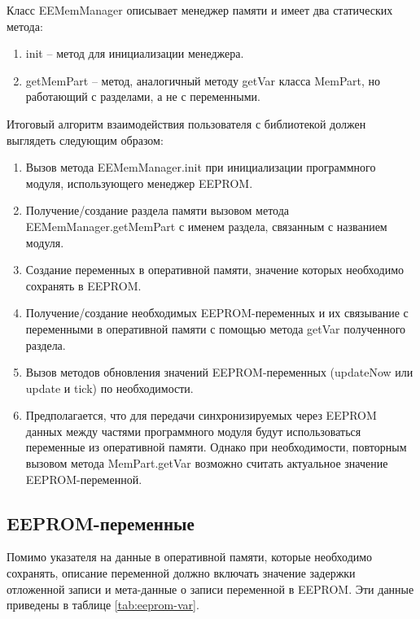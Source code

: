 Класс EEMemManager описывает менеджер памяти и имеет два статических метода:
\begin{enumerate}
	\item init -- метод для инициализации менеджера.
	\item getMemPart -- метод, аналогичный методу getVar класса MemPart, но работающий с разделами, а не с переменными.
\end{enumerate}


Итоговый алгоритм взаимодействия пользователя с библиотекой должен выглядеть следующим образом:
\begin{enumerate}
	\item Вызов метода EEMemManager.init при инициализации программного модуля, использующего менеджер EEPROM.
	\item Получение/создание раздела памяти вызовом метода EEMemManager.getMemPart с именем раздела, связанным с названием модуля.
	\item Создание переменных в оперативной памяти, значение которых необходимо сохранять в EEPROM.
	\item Получение/создание необходимых EEPROM-переменных и их связывание с переменными в оперативной памяти с помощью метода getVar полученного раздела.
	\item Вызов методов обновления значений EEPROM-переменных (updateNow или update и tick) по необходимости.
	\item Предполагается, что для передачи синхронизируемых через EEPROM данных между частями программного модуля будут использоваться переменные из оперативной памяти. Однако при необходимости, повторным вызовом метода MemPart.getVar возможно считать актуальное значение EEPROM-переменной.
\end{enumerate}


\subsection{EEPROM-переменные}

Помимо указателя на данные в оперативной памяти, которые необходимо сохранять, описание переменной должно включать значение задержки отложенной записи и мета-данные о записи переменной в EEPROM.
Эти данные приведены в таблице \ref{tab:eeprom-var}.

